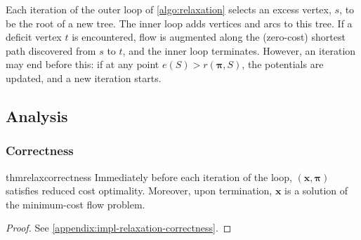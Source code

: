 Each iteration of the outer loop of \cref{algo:relaxation} selects an excess vertex, $s$, to be the root of a new tree. The inner loop adds vertices and arcs to this tree. If a deficit vertex $t$ is encountered, flow is augmented along the (zero-cost) shortest path discovered from $s$ to $t$, and the inner loop terminates. However, an iteration may end before this: if at any point $e(S) > r(\boldsymbol{\pi},S)$, the potentials are updated, and a new iteration starts\footnotemark.

\subsection{Analysis} \label{sec:impl-relax-analysis}


\subsubsection{Correctness}

\begin{restatable}{thm}{relaxcorrectness} \label{thm:relax-correctness}
Immediately before each iteration of the loop, $(\mathbf{x},\boldsymbol{\pi})$ satisfies reduced cost optimality. Moreover, upon termination, $\mathbf{x}$ is a solution of the minimum-cost flow problem.
\end{restatable}
\begin{proof}
See \cref{appendix:impl-relaxation-correctness}.
\end{proof}

